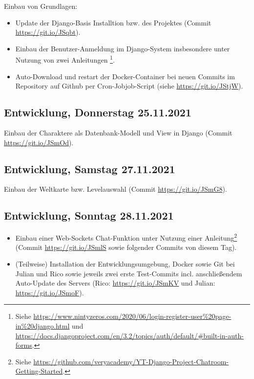 Einbau von Grundlagen: 
\begin{itemize}
    \item Update der Django-Basis Installtion bzw. des Projektes (Commit \url{https://git.io/JSqbt}). 
    \item Einbau der Benutzer-Anmeldung im Django-System insbesondere unter Nutzung von zwei Anleitungen   \footnote{Siehe  \url{https://www.nintyzeros.com/2020/06/login-register-user\%20page-in\%20django.html} und \url{https://docs.djangoproject.com/en/3.2/topics/auth/default/\#built-in-auth-forms}.}.
    \item Auto-Download und restart der Docker-Container bei neuen Commits im Repository auf Github per Cron-Jobjob-Script (siehe \url{https://git.io/JStjW}).
\end{itemize}




\subsection{Entwicklung, Donnerstag 25.11.2021}

Einbau der Charaktere als Datenbank-Modell und View in Django (Commit \url{https://git.io/JSmOd}).



\subsection{Entwicklung, Samstag 27.11.2021}

Einbau der Weltkarte bzw. Levelauswahl (Commit \url{https://git.io/JSmG8}).



\subsection{Entwicklung, Sonntag 28.11.2021}

\begin{itemize}
    \item Einbau einer Web-Sockets Chat-Funktion unter Nutzung einer Anleitung\footnote{Siehe \url{https://github.com/veryacademy/YT-Django-Project-Chatroom-Getting-Started}. } (Commit \url{https://git.io/JSmlS} sowie folgender Commits von diesem Tag).
    \item (Teilweise) Installation der Entwicklungsumgebung, Docker sowie Git bei Julian und Rico sowie jeweils zwei erste Test-Commits incl. anschließendem Auto-Update des Servers (Rico: \url{https://git.io/JSmKV} und Julian: \url{https://git.io/JSmoF}).
\end{itemize}



